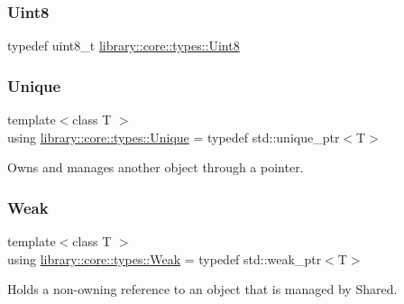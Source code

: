 \mbox{\label{namespacelibrary_1_1core_1_1types_a2fb690dd0eb982f92a642dbd0c985662}} 
\subsubsection{\texorpdfstring{Uint8}{Uint8}}
{\footnotesize\ttfamily typedef uint8\+\_\+t \hyperlink{namespacelibrary_1_1core_1_1types_a2fb690dd0eb982f92a642dbd0c985662}{library\+::core\+::types\+::\+Uint8}}

\mbox{\label{namespacelibrary_1_1core_1_1types_ac12d38691838fbc9a36765ee62ace52a}} 
\subsubsection{\texorpdfstring{Unique}{Unique}}
{\footnotesize\ttfamily template$<$class T $>$ \\
using \hyperlink{namespacelibrary_1_1core_1_1types_ac12d38691838fbc9a36765ee62ace52a}{library\+::core\+::types\+::\+Unique} = typedef std\+::unique\+\_\+ptr$<$T$>$}



Owns and manages another object through a pointer. 

\mbox{\label{namespacelibrary_1_1core_1_1types_a26c13c272f9fba4ce17ee4980be6703c}} 
\subsubsection{\texorpdfstring{Weak}{Weak}}
{\footnotesize\ttfamily template$<$class T $>$ \\
using \hyperlink{namespacelibrary_1_1core_1_1types_a26c13c272f9fba4ce17ee4980be6703c}{library\+::core\+::types\+::\+Weak} = typedef std\+::weak\+\_\+ptr$<$T$>$}



Holds a non-\/owning reference to an object that is managed by Shared. 



